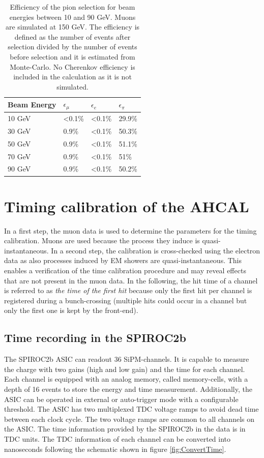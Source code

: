 \documentclass{JINST}
\begin{document}
\begin{table}[htb!]
	\centering
	\caption{Efficiency of the pion selection for beam energies between 10 and 90 GeV. Muons are simulated at 150 GeV. The efficiency is defined as the number of events after selection divided by the number of events before selection and it is estimated from Monte-Carlo. No Cherenkov efficiency is included in the calculation as it is not simulated.}
	\label{table:eff_pion}
	\begin{tabular}{@{} llll @{}}
		\toprule
		\textbf{Beam Energy} & \textbf{$\epsilon_{\mu}$} & \textbf{$\epsilon_{e}$} & \textbf{$\epsilon_{\pi}$}\\
		\midrule
		10 GeV & <0.1\% & <0.1\% & 29.9\%\\
		30 GeV & 0.9\% & <0.1\% & 50.3\%\\
		50 GeV & 0.9\% & <0.1\% & 51.1\%\\
		70 GeV & 0.9\% & <0.1\% & 51\%\\
		90 GeV & 0.9\% & <0.1\% & 50.2\%\\
		\bottomrule
	\end{tabular}
\end{table}

\section{Timing calibration of the AHCAL}

In a first step, the muon data is used to determine the parameters for the timing calibration. Muons are used because the process they induce is quasi-instantaneous. In a second step, the calibration is cross-checked using the electron data as also processes induced by EM showers are quasi-instantaneous. This enables a verification of the time calibration procedure and may reveal effects that are not present in the muon data. In the following, the hit time of a channel is referred to as \textit{the time of the first hit} because only the first hit per channel is registered during a bunch-crossing (multiple hits could occur in a channel but only the first one is kept by the front-end).

\subsection{Time recording in the SPIROC2b}

The SPIROC2b ASIC can readout 36 SiPM-channels. It is capable to measure the charge with two gains (high and low gain) and the time for each channel. Each channel is equipped with an analog memory, called memory-cells, with a depth of 16 events to store the energy and time measurement. Additionally, the ASIC can be operated in external or auto-trigger mode with a configurable threshold. The ASIC has two multiplexed TDC voltage ramps to avoid dead time between each clock cycle. The two voltage ramps are common to all channels on the ASIC. The time information provided by the SPIROC2b in the data is in TDC units. The TDC information of each channel can be converted into nanoseconds following the schematic shown in figure \ref{fig:ConvertTime}.
\end{document}
